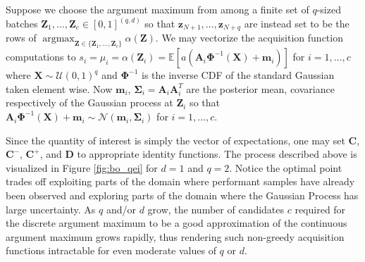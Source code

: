 \documentclass[graybox]{svmult}
\begin{document}
Suppose we choose the argument maximum  from among a finite set of $q$-sized batches $\boldsymbol{Z}_1,\dots,\boldsymbol{Z}_c \in [0,1]^{(q, d)}$ so that $\boldsymbol{z}_{N+1}, \dots,\boldsymbol{z}_{N+q}$ are instead set to be the rows of $\mathop{\text{argmax}}_{\boldsymbol{Z} \in \{\boldsymbol{Z}_1,\dots,\boldsymbol{Z}_c\}}\alpha(\boldsymbol{Z})$. We may vectorize the acquisition function computations to $s_i = \mu_i = \alpha(\boldsymbol{Z}_i) = \mathbb{E}\left[a\left(\boldsymbol{A}_i\boldsymbol{\Phi}^{-1}(\boldsymbol{X})+\boldsymbol{m}_i\right)\right]$ for $i=1,\dots,c$ where $\boldsymbol{X} \sim \mathcal{U}(0,1)^q$ and $\boldsymbol{\Phi}^{-1}$ is the inverse CDF of the standard Gaussian taken element wise. Now $\boldsymbol{m}_i$, $\boldsymbol{\Sigma}_i = \boldsymbol{A}_i\boldsymbol{A}_i^T$ are the posterior mean, covariance respectively of the Gaussian process at $\boldsymbol{Z}_i$ so that $\boldsymbol{A}_i\boldsymbol{\Phi}^{-1}(\boldsymbol{X})+\boldsymbol{m}_i \sim \mathcal{N}\left(\boldsymbol{m}_i,\boldsymbol{\Sigma}_i\right)$ for $i=1,\dots,c$.

Since the quantity of interest is simply the vector of expectations, one may set $\boldsymbol{C}$, $\boldsymbol{C}^-$, $\boldsymbol{C}^+$, and $\boldsymbol{D}$ to appropriate identity functions. The process described above is visualized in Figure \ref{fig:bo_qei} for $d=1$ and $q=2$. Notice the optimal point trades off exploiting parts of the domain where performant samples have already been observed and  exploring parts of the domain where the Gaussian Process has large uncertainty.  As $q$ and/or $d$ grow, the number of candidates $c$ required for the discrete argument maximum to be a good approximation of the continuous argument maximum grows rapidly, thus rendering such non-greedy acquisition functions intractable for even moderate values of $q$ or $d$.
\end{document}
